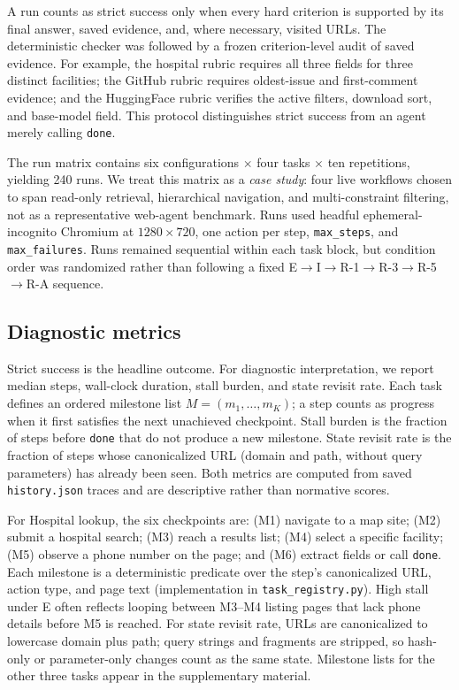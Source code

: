 \documentclass[runningheads]{llncs}
\DeclareRobustCommand{\code}[1]{\allowbreak\nolinkurl{#1}\allowbreak}
\begin{document}
A run counts as strict success only when every hard criterion is
supported by its final answer, saved evidence, and, where necessary, visited
URLs. The deterministic checker was followed by a frozen criterion-level audit
of saved evidence. For example, the hospital rubric requires all three fields
for three distinct facilities; the GitHub rubric requires oldest-issue and
first-comment evidence; and the HuggingFace rubric verifies the active filters,
download sort, and base-model field. This protocol distinguishes strict success
from an agent merely calling \code{done}.

The run matrix contains six configurations $\times$ four tasks $\times$ ten
repetitions, yielding 240 runs. We treat this matrix as a \emph{case study}:
four live workflows chosen to span read-only retrieval, hierarchical navigation,
and multi-constraint filtering, not as a representative web-agent benchmark.
Runs used headful ephemeral-incognito Chromium
at $1280\times720$, one action per step, \code{max\_steps}=35, and
\code{max\_failures}=3. Runs remained sequential within each task block, but
condition order was randomized rather than following a fixed
E$\rightarrow$I$\rightarrow$R-1$\rightarrow$R-3$\rightarrow$R-5$\rightarrow$R-A
sequence.

\subsection{Diagnostic metrics}

Strict success is the headline outcome. For diagnostic interpretation, we report
median steps, wall-clock duration, stall burden, and state revisit
rate. Each task defines an ordered milestone list $M=(m_1,\ldots,m_K)$; a step
counts as progress when it first satisfies the next unachieved checkpoint.
Stall burden is the fraction of steps before \code{done} that do not
produce a new milestone. State revisit rate is the fraction of steps whose
canonicalized URL (domain and path, without query parameters) has already been
seen. Both metrics are computed from saved \code{history.json} traces and are
descriptive rather than normative scores.

For Hospital lookup, the six checkpoints are: (M1) navigate to a map site;
(M2) submit a hospital search; (M3) reach a results list; (M4) select a
specific facility; (M5) observe a phone number on the page; and (M6) extract
fields or call \code{done}. Each milestone is a deterministic predicate over
the step's canonicalized URL, action type, and page text (implementation in
\code{task\_registry.py}). High stall under E often reflects looping between
M3--M4 listing pages that lack phone details before M5 is reached. For state
revisit rate, URLs are canonicalized to lowercase domain plus path; query
strings and fragments are stripped, so hash-only or parameter-only changes
count as the same state. Milestone lists for the other three tasks appear in
the supplementary material.
\end{document}
